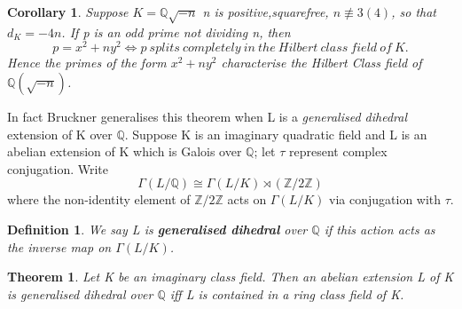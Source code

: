 \documentclass[preprint,12pt,reqno]{elsarticle}
\newtheorem{theorem}{Theorem}
\newtheorem{corollary}{Corollary}[theorem]
\newtheorem{definition}{Definition}
\begin{document}
\begin{corollary}
Suppose $K=\mathbb{Q}{\sqrt{-n}}$ n is positive,squarefree, $n\not\equiv 3(4)$, so that $d_K=-4n$. If p is an odd prime not dividing n, then
\begin{equation} p=x^2+ny^2 \Longleftrightarrow p\:splits\:completely\:in\:the\:Hilbert\:class\:field\:of\:K.
\end{equation}
Hence the primes of the form $x^2+ny^2$ characterise the Hilbert Class field of $\mathbb{Q}(\sqrt{-n})$.
\end{corollary}
In fact Bruckner \cite{BRUC} generalises this theorem when L is a \textit{generalised dihedral} extension of K over $\mathbb{Q}$. Suppose K is an imaginary quadratic field and L is an abelian extension of K which is Galois over $\mathbb{Q}$; let $\tau$ represent complex conjugation. Write
\begin{equation}
   \Gamma(L/\mathbb{Q})\cong \Gamma(L/K)\rtimes(\mathbb{Z}/2\mathbb{Z})
\end{equation}
where the non-identity element of $\mathbb{Z}/2\mathbb{Z}$ acts on $\Gamma(L/K)$ via conjugation with $\tau$.
\begin{definition}
 We say L is \textbf{generalised dihedral} over $\mathbb{Q}$ if this action acts as the inverse map on $\Gamma(L/K)$.
\end{definition}

\begin{theorem}
Let K be an imaginary class field. Then an abelian extension L of K is generalised dihedral over $\mathbb{Q}$ iff L is contained in a ring class field of K.
\end{theorem}
\end{document}
